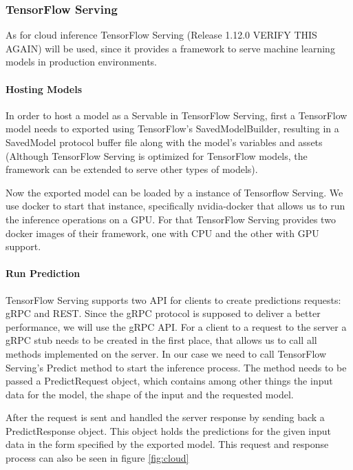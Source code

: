 \subsubsection{TensorFlow Serving}
As for cloud inference TensorFlow Serving (Release 1.12.0 VERIFY THIS AGAIN) will be used, since it provides a framework to serve machine learning models in production environments. 



\paragraph{Hosting Models}
In order to host a model as a Servable in TensorFlow Serving, first a TensorFlow model needs to exported using TensorFlow's SavedModelBuilder, resulting in a SavedModel protocol buffer file along with the model’s variables and assets (Although TensorFlow Serving is optimized for TensorFlow models, the framework can be extended to serve other types of models).

Now the exported model can be loaded by a instance of Tensorflow Serving.
We use docker to start that instance, specifically nvidia-docker that allows us to run the inference operations on a GPU. For that TensorFlow Serving provides two docker images of their framework, one with CPU and the other with GPU support.

\paragraph{Run Prediction}
TensorFlow Serving supports two API for clients to create predictions requests: gRPC and REST. Since the gRPC protocol is supposed to deliver a better performance, we will use the gRPC API.
For a client to a request to the server a gRPC stub needs to be created in the first place, that allows us to call all methods implemented on the server. In our case we need to call TensorFlow Serving's Predict method to start the inference process. The method needs to be passed a PredictRequest object, which contains among other things the input data for the model, the shape of the input and the requested model.%

After the request is sent and handled the server response by sending back a PredictResponse object. This object holds the predictions for the given input data in the form specified by the exported model.
This request and response process can also be seen in figure \ref{fig:cloud}

